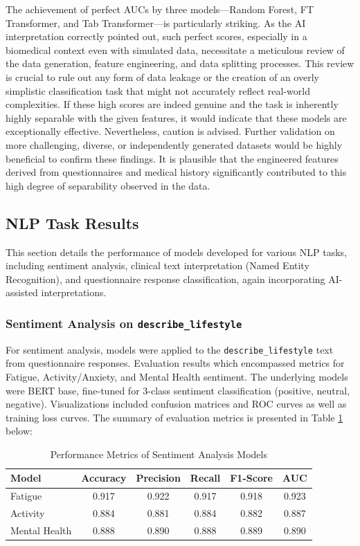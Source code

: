 The achievement of perfect AUCs by three models—Random Forest, FT Transformer, and Tab Transformer—is particularly striking. As the AI interpretation correctly pointed out, such perfect scores, especially in a biomedical context even with simulated data, necessitate a meticulous review of the data generation, feature engineering, and data splitting processes. This review is crucial to rule out any form of data leakage or the creation of an overly simplistic classification task that might not accurately reflect real-world complexities. If these high scores are indeed genuine and the task is inherently highly separable with the given features, it would indicate that these models are exceptionally effective. Nevertheless, caution is advised. Further validation on more challenging, diverse, or independently generated datasets would be highly beneficial to confirm these findings. It is plausible that the engineered features derived from questionnaires and medical history significantly contributed to this high degree of separability observed in the data.

\subsection{NLP Task Results}

This section details the performance of models developed for various NLP tasks, including sentiment analysis, clinical text interpretation (Named Entity Recognition), and questionnaire response classification, again incorporating AI-assisted interpretations.

\subsubsection{Sentiment Analysis on \texttt{describe\_lifestyle}}

For sentiment analysis, models were applied to the \texttt{describe\_lifestyle} text from questionnaire responses. Evaluation results which encompassed metrics for Fatigue, Activity/Anxiety, and Mental Health sentiment. The underlying models were BERT base, fine-tuned for 3-class sentiment classification (positive, neutral, negative). Visualizations included confusion matrices and ROC curves as well as training loss curves. The summary of evaluation metrics is presented in Table \ref{tab:sentiment_analysis_performance} below:

\begin{table}[htbp]
    \centering
    \caption{Performance Metrics of Sentiment Analysis Models}
    \label{tab:sentiment_analysis_performance}
    \begin{tabular}{lccccc}
        \hline
        \textbf{Model} & \textbf{Accuracy} & \textbf{Precision} & \textbf{Recall} & \textbf{F1-Score} & \textbf{AUC} \\
        \hline
        Fatigue & 0.917 & 0.922 & 0.917 & 0.918 & 0.923 \\
        Activity & 0.884 & 0.881 & 0.884 & 0.882 & 0.887 \\
        Mental Health & 0.888 & 0.890 & 0.888 & 0.889 & 0.890 \\
        \hline
    \end{tabular}
\end{table}

